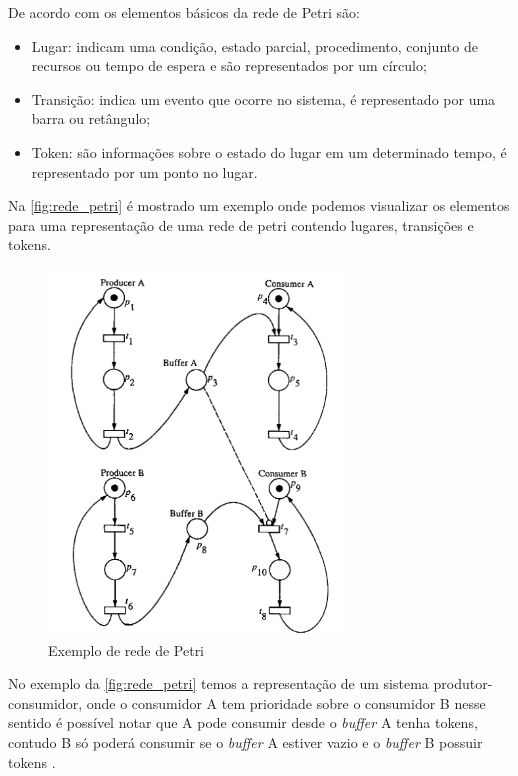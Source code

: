        \par
        De acordo com  os elementos básicos da rede de Petri são:
        \begin{itemize}
            \item Lugar: indicam uma condição, estado parcial, procedimento, conjunto de recursos ou tempo de espera e são representados por um círculo;
            \item Transição: indica um evento que ocorre no sistema, é representado por uma barra ou retângulo;
            \item Token: são informações sobre o estado do lugar em um determinado tempo, é representado por um ponto no lugar.
        \end{itemize} Na \autoref{fig:rede_petri} é mostrado um exemplo onde podemos visualizar os elementos para uma representação de  uma rede de petri contendo lugares, transições e tokens.
        \begin{figure}[H]
              \caption{\label{fig:rede_petri}{Exemplo de rede de Petri}}
              \centering
              \includegraphics[width=0.7\textwidth]{Figuras/exemplo_rede_petri.png}
        \end{figure}
        \par
        No exemplo da \autoref{fig:rede_petri} temos a representação de um sistema produtor-consumidor, onde o consumidor A tem prioridade sobre o consumidor B nesse sentido é possível notar que A pode consumir desde o \textit{buffer} A tenha tokens, contudo B só poderá consumir se o \textit{buffer} A estiver vazio e o \textit{buffer} B possuir tokens \cite{murata}.


